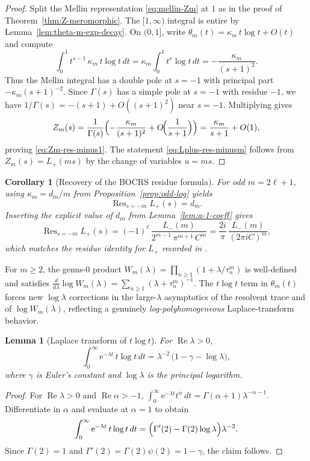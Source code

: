 \documentclass[11pt,letterpaper]{amsart}
\numberwithin{equation}{section}
\newtheorem{lemma}[theorem]{Lemma}
\newtheorem{corollary}[theorem]{Corollary}
\theoremstyle{definition}
\newcommand{\Ree}{\operatorname{Re}}
\newcommand{\e}{\mathrm{e}}
\newcommand{\Res}{\operatorname{Res}}
\begin{document}
\begin{proof}
Split the Mellin representation \eqref{eq:mellin-Zm} at $1$ as in the proof of
Theorem~\ref{thm:Z-meromorphic}. The $[1,\infty)$ integral is entire by Lemma~\ref{lem:theta-m-exp-decay}.
On $(0,1]$, write $\theta_m(t)=\kappa_m\,t\log t + O(t)$ and compute
\[
\int_0^1 t^{s-1}\,\kappa_m\,t\log t\,dt
=\kappa_m\int_0^1 t^{s}\log t\,dt
=-\frac{\kappa_m}{(s+1)^2}.
\]
Thus the Mellin integral has a double pole at $s=-1$ with principal part $-\kappa_m(s+1)^{-2}$.
Since $\Gamma(s)$ has a simple pole at $s=-1$ with residue $-1$, we have
$1/\Gamma(s)=-(s+1)+O((s+1)^2)$ near $s=-1$.
Multiplying gives
\[
Z_m(s)=\frac{1}{\Gamma(s)}\Bigl(-\frac{\kappa_m}{(s+1)^2}+O\!\Bigl(\frac{1}{s+1}\Bigr)\Bigr)
=\frac{\kappa_m}{s+1}+O(1),
\]
proving \eqref{eq:Zm-res-minus1}. The statement \eqref{eq:Lplus-res-minusm} follows from $Z_m(s)=L_+(ms)$
by the change of variables $u=ms$.
\end{proof}

\begin{corollary}[Recovery of the BOCRS residue formula]\label{cor:BOCRS-residue-from-heat}
For odd $m=2\ell+1$, using $\kappa_m=d_m/m$ from Proposition~\ref{prop:odd-log} yields
\[
\Res_{s=-m}L_+(s)=d_m.
\]
Inserting the explicit value of $d_m$ from Lemma~\ref{lem:a-1-coeff} gives
\[
\Res_{s=-m}L_+(s)=(-1)^{\ell}\,\frac{L_-(m)}{2^{m-1}\,\pi^{m+1}\,C^{m}}
=\frac{2i}{\pi}\,\frac{L_-(m)}{(2\pi i C)^{m}},
\]
which matches the residue identity for $L_+$ recorded in \cite[\S10.2]{BOCRS}.
\end{corollary}


For $m\ge2$, the genus-$0$ product
$W_m(\lambda)=\prod_{n\ge1}(1+\lambda/\tau_n^m)$ is well-defined and satisfies
$\frac{d}{d\lambda}\log W_m(\lambda)=\sum_{n\ge1}(\lambda+\tau_n^m)^{-1}$.
The $t\log t$ term in $\theta_m(t)$ forces new $\log\lambda$ corrections in the large-$\lambda$
asymptotics of the resolvent trace and of $\log W_m(\lambda)$, reflecting a genuinely
\emph{log-polyhomogeneous} Laplace-transform behavior.

\begin{lemma}[Laplace transform of $t\log t$]\label{lem:laplace-tlogt}
For $\Ree\lambda>0$,
\[
\int_0^\infty \e^{-\lambda t}\,t\log t\,dt
=\lambda^{-2}\,\bigl(1-\gamma-\log\lambda\bigr),
\]
where $\gamma$ is Euler's constant and $\log\lambda$ is the principal logarithm.
\end{lemma}

\begin{proof}
For $\Ree\lambda>0$ and $\Ree\alpha>-1$,
$\int_0^\infty \e^{-\lambda t}t^\alpha\,dt=\Gamma(\alpha+1)\lambda^{-\alpha-1}$.
Differentiate in $\alpha$ and evaluate at $\alpha=1$ to obtain
\[
\int_0^\infty \e^{-\lambda t}\,t\log t\,dt
=\Bigl(\Gamma'(2)-\Gamma(2)\log\lambda\Bigr)\lambda^{-2}.
\]
Since $\Gamma(2)=1$ and $\Gamma'(2)=\Gamma(2)\psi(2)=1-\gamma$, the claim follows.
\end{proof}
\end{document}

